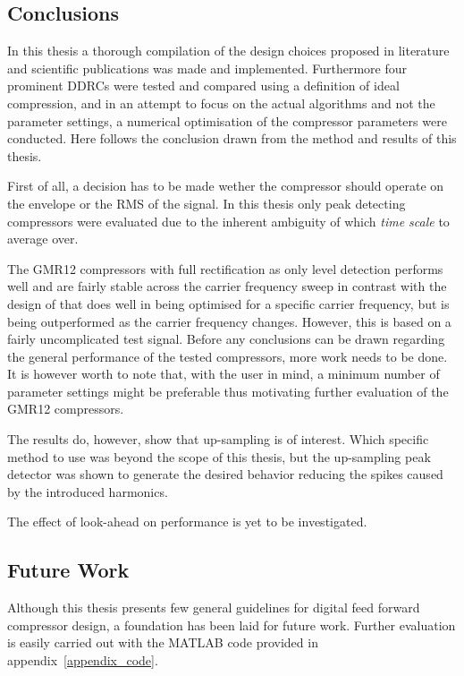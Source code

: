 \documentclass[../main2.tex]{subfiles}
\begin{document}
\subsection{Conclusions}\label{discussion_results}
In this thesis a thorough compilation of the design choices proposed in literature and scientific publications was made and implemented. Furthermore four prominent DDRCs were tested and compared using a definition of ideal compression, and in an attempt to focus on the actual algorithms and not the parameter settings, a numerical optimisation of the compressor parameters were conducted. Here follows the conclusion drawn from the method and results of this thesis.

First of all, a decision has to be made wether the compressor should operate on the envelope or the RMS of the signal. In this thesis only peak detecting compressors were evaluated due to the inherent ambiguity of which \emph{time scale} to average over. 

The GMR12 compressors with full rectification as only level detection performs well and are fairly stable across the carrier frequency sweep in contrast with the design of \cite{mcnally1984dynamic} that does well in being optimised for a specific carrier frequency, but is being outperformed as the carrier frequency changes. However, this is based on a fairly uncomplicated test signal. Before any conclusions can be drawn regarding the general performance of the tested compressors, more work needs to be done. It is however worth to note that, with the user in mind, a minimum number of parameter settings might be preferable thus motivating further evaluation of the GMR12 compressors.

The results do, however, show that up-sampling is of interest. Which specific method to use was beyond the scope of this thesis, but the up-sampling peak detector was shown to generate the desired behavior reducing the spikes caused by the introduced harmonics.

The effect of look-ahead on performance is yet to be investigated.

\subsection{Future Work}
Although this thesis presents few general guidelines for digital feed forward compressor design, a foundation has been laid for future work. Further evaluation is easily carried out with the MATLAB\textsuperscript{\textregistered} code provided in appendix~\ref{appendix_code}. 
\end{document}
